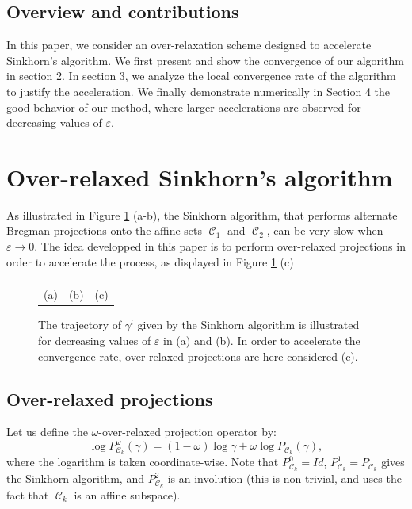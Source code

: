 \documentclass{article} %
\DeclareMathOperator{\Ccal}{\mathcal{C}}
\renewcommand{\epsilon}{\varepsilon}
\theoremstyle{plain}
\theoremstyle{definition}
\theoremstyle{remark}
\begin{document}
\subsection{Overview and contributions}
In this paper, we consider an over-relaxation scheme designed to accelerate   Sinkhorn's algorithm. We first present and show the convergence of our algorithm in section 2. In section 3, we analyze the local convergence rate of the algorithm to justify the acceleration.
We finally demonstrate numerically  in Section 4 the good behavior of our method, where larger accelerations are observed for decreasing values of $\epsilon$.



\section{Over-relaxed Sinkhorn's algorithm}

As illustrated in Figure \ref{alternate_projections} (a-b), the Sinkhorn algorithm, that  performs alternate Bregman projections onto the affine sets $\Ccal_1$ and $\Ccal_2$, can be very slow when $\epsilon\to 0$. The idea developped in this paper is to perform over-relaxed projections in order to accelerate the process, as displayed in Figure \ref{alternate_projections} (c) 

\begin{figure}[ht!]
\begin{center}
\begin{tabular}{ccc}
&
&
\\
(a)&(b)&(c)
\end{tabular}
\caption{\label{alternate_projections} The trajectory of $\gamma^l$ given by the Sinkhorn algorithm is illustrated for decreasing values of $\epsilon$ in (a) and (b). In order to accelerate the convergence rate, over-relaxed projections are here considered (c).}
\end{center}
\end{figure}
\subsection{Over-relaxed projections}

Let us define the $\omega$-over-relaxed projection operator by:
\begin{equation}\label{eq:def_or_proj}
\log P^\omega_{\Ccal_k}(\gamma) = (1-\omega) \log \gamma + \omega \log P_{\Ccal_k}(\gamma),
\end{equation}
where the logarithm is taken coordinate-wise.
Note that $P_{\Ccal_k}^0 = Id$, $P_{\Ccal_k}^1 = P_{\Ccal_k}$ gives the Sinkhorn algorithm, and $P_{\Ccal_k}^2$ is an involution (this is non-trivial, and uses the fact that $\Ccal_k$ is an affine subspace).
\end{document}
